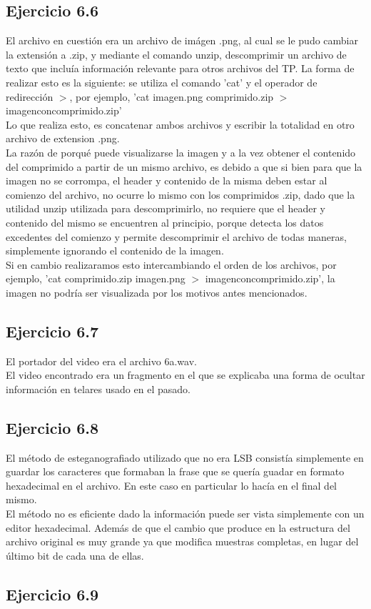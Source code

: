 \documentclass{article}
\begin{document}
\subsection{Ejercicio 6.6}
\noindent El archivo en cuestión era un archivo de imágen .png, al cual se le pudo cambiar la extensión a .zip, y mediante el comando unzip, descomprimir un archivo de texto que incluía información relevante para otros archivos del TP. La forma de realizar esto es la siguiente: se utiliza el comando 'cat' y el operador de redirección $>$, por ejemplo, 'cat imagen.png comprimido.zip $>$ imagenconcomprimido.zip'\\
\noindent Lo que realiza esto, es concatenar ambos archivos y escribir la totalidad en otro archivo de extension .png. \\
\noindent La razón de porqué puede visualizarse la imagen y a la vez obtener el contenido del comprimido a partir de un mismo archivo, es debido a que si bien para que la imagen no se corrompa, el header y contenido de la misma deben estar al comienzo del archivo, no ocurre lo mismo con los comprimidos .zip, dado que la utilidad unzip utilizada para descomprimirlo, no requiere que el header y contenido del mismo se encuentren al principio, porque detecta los datos excedentes del comienzo y permite descomprimir el archivo de todas maneras, simplemente ignorando el contenido de la imagen.\\
\noindent Si en cambio realizaramos esto intercambiando el orden de los archivos, por ejemplo, 'cat comprimido.zip imagen.png $>$ imagenconcomprimido.zip', la imagen no podría ser visualizada por los motivos antes mencionados.

\subsection{Ejercicio 6.7}

\noindent El portador del video era el archivo 6a.wav. \\ El video encontrado era un fragmento en el que se explicaba una forma de ocultar información en telares usado en el pasado.

\subsection{Ejercicio 6.8}

\noindent El método de esteganografiado utilizado que no era LSB consistía simplemente en guardar los caracteres que formaban la frase que se quería guadar en formato hexadecimal en el archivo. En este caso en particular lo hacía en el final del mismo.\\
El método no es eficiente dado la información puede ser vista simplemente con un editor hexadecimal. Además de que el cambio que produce en la estructura del archivo original es muy grande ya que modifica muestras completas, en lugar del último bit de cada una de ellas.\\

\subsection{Ejercicio 6.9}
\end{document}

